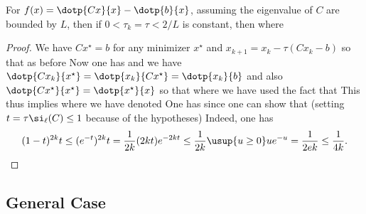 \begin{prop}\label{prop-graddesc-quad-sublin}
	For $f(x)=\dotp{Cx}{x}-\dotp{b}{x}$, assuming the eigenvalue of $C$ are bounded by $L$, then if $0<\tau_k=\tau < 2/L$ is constant, then
	where 
\end{prop}
\begin{proof}	
	We have $C x^\star=b$ for any minimizer $x^\star$
	and $x_{k+1}=x_k-\tau (C x_k-b)$ so that as before
	Now one has
	and we have $\dotp{Cx_k}{x^\star} = \dotp{x_k}{Cx^\star} = \dotp{x_k}{b}$
	and also $\dotp{Cx^\star}{x^\star} = \dotp{x^\star}{x}$ so that
	where we have used the fact that
	This thus implies 
	where we have denoted
	One has 
	since one can show that (setting $t = \tau \si_\ell(C) \leq 1$ because of the hypotheses)
	Indeed, one has
	\begin{align*}
		(1-t)^{2k} t \leq (e^{-t})^{2k}t
		= \frac{1}{2k} (2kt) e^{-2k t}
		\leq \frac{1}{2k} \usup{u \geq 0} u e^{-u}
		= \frac{1}{2e k} \leq \frac{1}{4k}.
	\end{align*}
\end{proof}	
	



\subsection{General Case}

